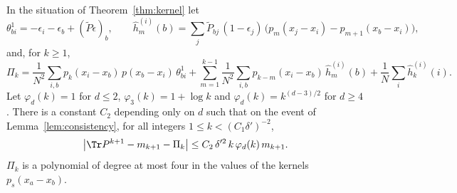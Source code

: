 
\begin{proposition}\label{prop:reduction}
In the situation of Theorem~\ref{thm:kernel} let
\[
\theta^1_{bi}=-\epsilon_i-\epsilon_b+(\tilde P\epsilon)_b,\qquad
\hat h^{(i)}_m(b)=\sum_j\tilde P_{bj}\,(1-\epsilon_j)\,\big(p_m(x_j-x_i)-p_{m+1}(x_b-x_i)\big),
\]
and, for $k\ge1$,
\[
\Pi_k=\frac1{N^2}\sum_{i,b}p_k(x_i-x_b)\,p(x_b-x_i)\,\theta^1_{bi}
+\sum_{m=1}^{k-1}\frac1{N^2}\sum_{i,b}p_{k-m}(x_i-x_b)\,\hat h^{(i)}_m(b)
+\frac1N\sum_i\hat h^{(i)}_k(i).
\]
Let $\varphi_d(k)=1$ for $d\le2$, $\varphi_3(k)=1+\log k$ and $\varphi_d(k)=k^{(d-3)/2}$ for $d\ge4$. There is a constant $C_2$ depending only on $d$ such that on the event of Lemma~\ref{lem:consistency}, for all integers $1\le k<(C_1\delta')^{-2}$,
\[
\big|\Tr P^{k+1}-m_{k+1}-\Pi_k\big|\le C_2\,\delta'^2\,k\,\varphi_d(k)\,m_{k+1}.
\]
$\Pi_k$ is a polynomial of degree at most four in the values of the kernels $p_s(x_a-x_b)$.
\end{proposition}

